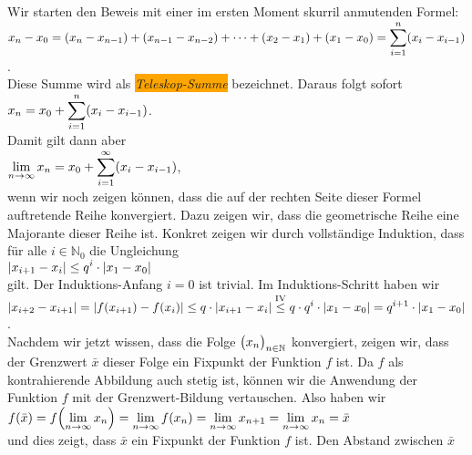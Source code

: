 \proof
Wir starten den Beweis mit einer im
ersten Moment skurril anmutenden Formel: 
\\[0.2cm]
\hspace*{0.8cm}
$\displaystyle x_n - x_0 = (x_n - x_{n-1}) + (x_{n-1} - x_{n-2}) + \cdots + (x_2 - x_1) + (x_1 - x_0) = \sum\limits_{i=1}^n (x_i - x_{i-1})$.
\\[0.2cm]
Diese Summe wird als \colorbox{orange}{\emph{Teleskop-Summe}} bezeichnet.
Daraus folgt sofort 
\\[0.2cm]
\hspace*{1.3cm}
$\displaystyle x_n = x_0 + \sum\limits_{i=1}^n (x_i - x_{i-1})$.
\\[0.2cm]
Damit gilt dann aber
\\[0.2cm]
\hspace*{1.3cm}
$\displaystyle\lim\limits_{n\rightarrow\infty} x_n = x_0 + \sum\limits_{i=1}^\infty (x_i - x_{i-1})$,
\\[0.2cm]
wenn wir noch zeigen k\"onnen, dass
die auf der rechten Seite dieser Formel auftretende Reihe konvergiert.  Dazu zeigen wir, dass die geometrische Reihe eine Majorante dieser Reihe ist.
Konkret zeigen wir durch vollst\"andige Induktion, dass f\"ur alle $i\in\mathbb{N}_0$ die Ungleichung
\\[0.2cm]
\hspace*{1.3cm}
$\displaystyle|x_{i+1} - x_i| \leq q^i \cdot |x_1 - x_0|$
\\[0.2cm]
gilt.  Der Induktions-Anfang $i = 0$ ist trivial.  Im Induktions-Schritt haben wir
\\[0.2cm]
\hspace*{0.8cm}
$\displaystyle|x_{i+2} - x_{i+1}| = |f(x_{i+1}) - f(x_i)| \leq q \cdot  |x_{i+1} - x_i| \stackrel{\mbox{\scriptsize IV}}{\leq}
q \cdot  q^i \cdot  |x_1 - x_0| = q^{i+1} \cdot  |x_1 - x_0|$.
\\[0.3cm]
Nachdem wir jetzt wissen, dass die Folge $\bigl(x_n\bigr)_{n\in\mathbb{N}}$ konvergiert, zeigen wir, dass der
Grenzwert $\bar{x}$ dieser Folge ein Fixpunkt der Funktion $f$ ist.  Da $f$ als kontrahierende
Abbildung auch stetig ist, k\"onnen wir die Anwendung der Funktion $f$ mit der Grenzwert-Bildung
vertauschen.  Also haben wir 
\\[0.2cm]
\hspace*{1.3cm}
$\displaystyle f(\bar{x}) = f\Bigl(\lim\limits_{n\rightarrow\infty} x_n\Bigr) =
\lim\limits_{n\rightarrow\infty} f(x_n) = \lim\limits_{n\rightarrow\infty} x_{n+1} =
\lim\limits_{n\rightarrow\infty} x_{n} = \bar{x}$
\\[0.2cm]
und dies zeigt, dass $\bar{x}$ ein Fixpunkt der Funktion $f$ ist.  Den Abstand zwischen $\bar{x}$
